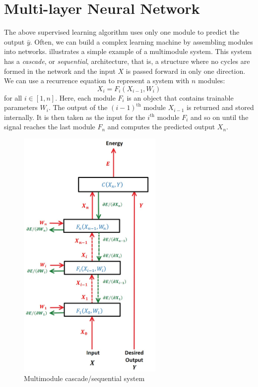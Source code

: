 \section{Multi-layer Neural Network}\label{sec: Systems with Multiple Modules}

The above supervised learning algorithm uses only one module to predict the output $\bar{y}$.
Often, we can build a complex learning machine by assembling modules into networks.
 illustrates a simple example of a multimodule system.
This system has a \textit{cascade}, or \textit{sequential}, architecture, that is, a structure where no cycles are formed in the network and the input $X$ is passed forward in only one direction.
We can use a recurrence equation to represent a system with $n$ modules:
\[
X_i = F_i(X_{i-1}, W_i)
\]
for all $i \in [1, n]$.
Here, each module $F_i$ is an object that contains trainable parameters $W_i$.
The output of the $(i-1)^\text{th}$ module $X_{i-1}$ is returned and stored internally.
It is then taken as the input for the $i^\text{th}$ module $F_i$ and so on until the signal reaches the last module $F_n$ and computes the predicted output $X_n$.

\begin{figure}[ht]
\centering
\includegraphics[width=70mm]{lectures/01-b/multimodule_cascade.jpg}
\caption{Multimodule cascade/sequential system}
\label{fig: multimodule_cascade}
\end{figure}

